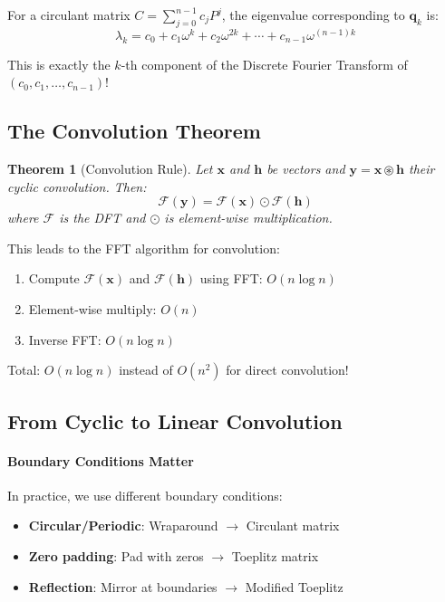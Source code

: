 \documentclass{article}
\newtheorem{theorem}{Theorem}
\begin{document}
For a circulant matrix $C = \sum_{j=0}^{n-1} c_j P^j$, the eigenvalue corresponding to $\mathbf{q}_k$ is:
\[
\lambda_k = c_0 + c_1 \omega^k + c_2 \omega^{2k} + \cdots + c_{n-1} \omega^{(n-1)k}
\]

This is exactly the $k$-th component of the Discrete Fourier Transform of $(c_0, c_1, \ldots, c_{n-1})$!

\subsection{The Convolution Theorem}

\begin{theorem}[Convolution Rule]
Let $\mathbf{x}$ and $\mathbf{h}$ be vectors and $\mathbf{y} = \mathbf{x} \circledast \mathbf{h}$ their cyclic convolution. Then:
\[
\mathcal{F}(\mathbf{y}) = \mathcal{F}(\mathbf{x}) \odot \mathcal{F}(\mathbf{h})
\]
where $\mathcal{F}$ is the DFT and $\odot$ is element-wise multiplication.
\end{theorem}

This leads to the FFT algorithm for convolution:
\begin{enumerate}
    \item Compute $\mathcal{F}(\mathbf{x})$ and $\mathcal{F}(\mathbf{h})$ using FFT: $O(n \log n)$
    \item Element-wise multiply: $O(n)$
    \item Inverse FFT: $O(n \log n)$
\end{enumerate}
Total: $O(n \log n)$ instead of $O(n^2)$ for direct convolution!

\subsection{From Cyclic to Linear Convolution}

\paragraph{Boundary Conditions Matter}

In practice, we use different boundary conditions:
\begin{itemize}
    \item \textbf{Circular/Periodic}: Wraparound $\rightarrow$ Circulant matrix
    \item \textbf{Zero padding}: Pad with zeros $\rightarrow$ Toeplitz matrix
    \item \textbf{Reflection}: Mirror at boundaries $\rightarrow$ Modified Toeplitz
\end{itemize}
\end{document}
